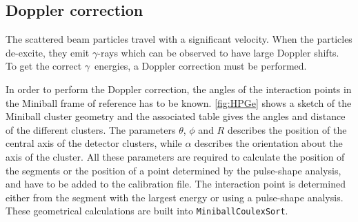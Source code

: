 \documentclass[twoside,english]{uiofysmaster/uiofysmaster}
\newcommand{\ga}{$\gamma$}
\let\orgautoref\autoref
\renewcommand{\autoref}
        {%
		 \def\sectionautorefname{Section}%
		 \def\subsectionautorefname{Section}%
		 \def\subsubsectionautorefname{Section}%
		 \def\chapterautorefname{Chapter}%
          \orgautoref}
\begin{document}
\subsection{Doppler correction}\label{ssec:Doppler}
The scattered beam particles travel with a significant velocity.
When the particles de-excite, they emit \ga-rays which can be observed to have large Doppler shifts.
To get the correct \ga\ energies, a Doppler correction must be performed.

In order to perform the Doppler correction, the angles of the interaction points in the Miniball frame of reference has to be known. 
\autoref{fig:HPGe} shows a sketch of the Miniball cluster geometry and the associated table gives the angles and distance of the different clusters.
The parameters $\theta$, $\phi$ and $R$ describes the position of the central axis of the detector clusters, while $\alpha$ describes the orientation about the axis of the cluster. 
All these parameters are required to calculate the position of the segments or the position of a point determined by the pulse-shape analysis, and have to be added to the calibration file. 
The interaction point is determined either from the segment with the largest energy or using a pulse-shape analysis. 
These geometrical calculations are built into \texttt{MiniballCoulexSort}.
\end{document}
